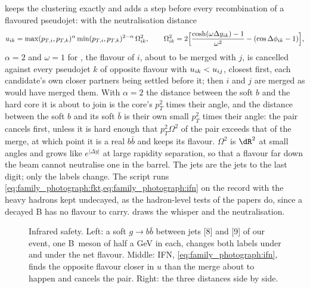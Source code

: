 keeps the \antikt clustering exactly and adds a step before every
recombination of a flavoured pseudojet: with the neutralisation distance
\begin{equation}
  u_{ik}=\max(p_{T,i},p_{T,k})^{\alpha}\min(p_{T,i},p_{T,k})^{2-\alpha}\,\Omega_{ik}^2,\qquad
  \Omega_{ik}^2=2\Big[\frac{\cosh(\omega\Delta y_{ik})-1}{\omega^2}-(\cos\Delta\phi_{ik}-1)\Big],
  \label{eq:family_photograph:ifn}
\end{equation}
$\alpha=2$ and $\omega=1$ for \antikt, the flavour of $i$, about to be
merged with $j$, is cancelled against every pseudojet $k$ of opposite
flavour with $u_{ik}<u_{ij}$, closest first, each candidate's own closer
partners being settled before it; then $i$ and $j$ are merged as \antikt
would have merged them. With $\alpha=2$ the distance between the soft
$b$ and the hard core it is about to join is the core's $p_T^2$ times
their angle, and the distance between the soft $b$ and its soft $\bar b$
is their own small $p_T^2$ times their angle: the pair cancels first,
unless it is hard enough that $p_T^2\Omega^2$ of the pair exceeds that of
the merge, at which point it is a real $b\bar b$ and keeps its flavour.
$\Omega^2$ is $\dR^2$ at small angles and grows like $e^{|\Delta y|}$ at
large rapidity separation, so that a flavour far down the beam cannot
neutralise one in the barrel. The jets are the \antikt jets to the last
digit; only the labels change. The script runs
\cref{eq:family_photograph:fkt,eq:family_photograph:ifn} on the record
with the heavy hadrons kept undecayed, as the hadron-level tests of the
papers do, since a decayed B has no flavour to carry.
 draws the whisper and the
neutralisation.

\begin{figure}[htbp]\centering
\resizebox{\textwidth}{!}{}
\caption[A soft $b\bar b$ pair relabels two jets; IFN neutralises it; the
three distances]{Infrared safety. Left: a soft $g\to b\bar b$ between
jets [8] and [9] of our event, one B~meson of half a GeV in each,
changes both labels under \hadflav and under the net flavour. Middle:
IFN, \cref{eq:family_photograph:ifn}, finds the opposite flavour closer
in $u$ than the merge about to happen and cancels the pair. Right: the
three distances side by side.}
\label{fig:family_photograph:irsafety_sketch}
\end{figure}

